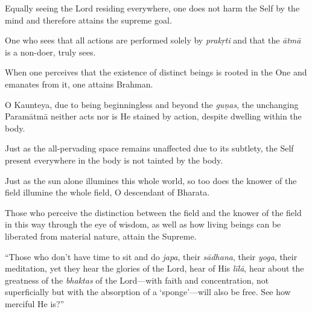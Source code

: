{Equally seeing the Lord residing everywhere, one does not harm the Self by the mind and therefore attains the supreme goal.}

{One who sees that all actions are performed solely by \textit{prakṛti} and that the \textit{ātmā} is a non-doer, truly sees.}

{When one perceives that the existence of distinct beings is rooted in the One and emanates from it, one attains Brahman.}

{O Kaunteya, due to being beginningless and beyond the \textit{guṇas}, the unchanging Paramātmā neither acts nor is He stained by action, despite dwelling within the body.}

{Just as the all-pervading space remains unaffected due to its subtlety, the Self present everywhere in the body is not tainted by the body.}

{Just as the sun alone illumines this whole world, so too does the knower of the field illumine the whole field, O descendant of Bharata.}

{Those who perceive the distinction between the field and the knower of the field in this way through the eye of wisdom, as well as how living beings can be liberated from material nature, attain the Supreme.}

\enquote{Those who don’t have time to sit and do \textit{japa}, their \textit{sādhana}, their \textit{yoga}, their meditation, yet they hear the glories of the Lord, hear of His \textit{līlā}, hear about the greatness of the \textit{bhaktas} of the Lord---with faith and concentration, not superficially but with the absorption of a \enquote{sponge}---will also be free. See how merciful He is?}

